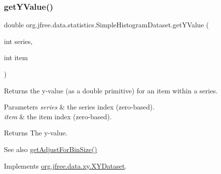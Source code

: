 \mbox{\label{classorg_1_1jfree_1_1data_1_1statistics_1_1_simple_histogram_dataset_ad84a0d6f8df0d044dfad47ddf28fc7a0}} 
\subsubsection{\texorpdfstring{get\+Y\+Value()}{getYValue()}}
{\footnotesize\ttfamily double org.\+jfree.\+data.\+statistics.\+Simple\+Histogram\+Dataset.\+get\+Y\+Value (\begin{DoxyParamCaption}\item[{int}]{series,  }\item[{int}]{item }\end{DoxyParamCaption})}

Returns the y-\/value (as a double primitive) for an item within a series.


\begin{DoxyParams}{Parameters}
{\em series} & the series index (zero-\/based). \\
\hline
{\em item} & the item index (zero-\/based).\\
\hline
\end{DoxyParams}
\begin{DoxyReturn}{Returns}
The y-\/value.
\end{DoxyReturn}
\begin{DoxySeeAlso}{See also}
\mbox{\hyperlink{classorg_1_1jfree_1_1data_1_1statistics_1_1_simple_histogram_dataset_a09695f11377643bfcc614305251d5d03}{get\+Adjust\+For\+Bin\+Size()}} 
\end{DoxySeeAlso}


Implements \mbox{\hyperlink{interfaceorg_1_1jfree_1_1data_1_1xy_1_1_x_y_dataset_a5e86389417eb5ed7b663a952ca370914}{org.\+jfree.\+data.\+xy.\+X\+Y\+Dataset}}.

\mbox{\label{classorg_1_1jfree_1_1data_1_1statistics_1_1_simple_histogram_dataset_a887a7d02aa9f339c8031c64a36f525bc}} 
